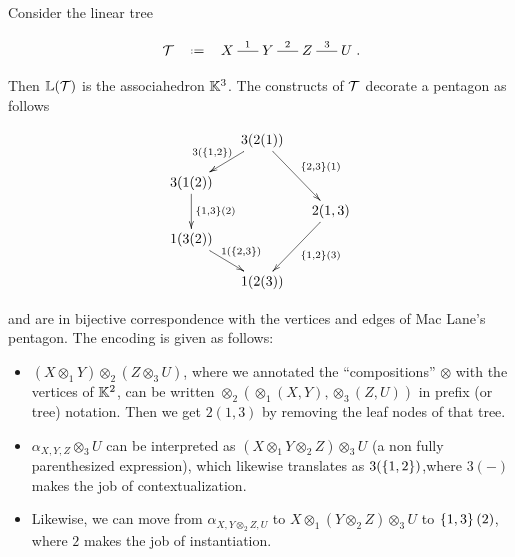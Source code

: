 \begin{example}
\begin{samepage}
Consider the linear tree
\vspace{-.7cm}
\begin{center}
$$\xymatrix @-1.65pc {{\cal T} & \eqdef  &X \ar @{-}[rr]^{1}&& Y \ar @{-}[rr]^{2}&& Z \ar @{-}[rr]^{3}&& U}.
  $$
\end{center}
\end{samepage}
Then ${\mathbb L}({\cal T})$ is the associahedron ${\mathbb K}^3$. 
The constructs of ${\cal T}$ decorate a pentagon as follows

\begin{center}
$$\xymatrix @-1.65pc {&& 3(2(1)) \ar @{->}[ddll]_{3(\set{1,2})} \ar @{->}[dddrr]^{\set{2,3}(1)}&& \\
 &&&&\\
3(1(2))   \ar @{->}[dd]^{\set{1,3}(2)}&&   && \\
 &&&&2(1,3) \ar @{->}[dddll]^{\set{1,2}(3)}\\
 1(3(2)) \ar @{->}[ddrr]^{1(\set{2,3})} &  &\\
 &&&&\\
 &&1(2(3))&&}$$
\end{center}
and are in bijective correspondence with the vertices and edges of Mac Lane's pentagon. 
The encoding is given as follows:
  \begin{itemize}
  \item $(X\otimes_1 Y)\otimes_2 (Z\otimes_3 U)$, where we annotated the ``compositions'' $\otimes$ with the vertices of ${\mathbb K}^2$, can be written $\otimes_2(\otimes_1(X,Y),\otimes_3(Z,U))$ in prefix (or tree) notation. Then we get 
 $2(1,3)$ by removing the leaf nodes of that tree.
 \item $\alpha_{X,Y,Z}\otimes_3 U$ can be interpreted as $(X\otimes_1 Y\otimes_2 Z)\otimes_3 U$ (a non fully parenthesized expression), which likewise 
 translates as $3(\left\{1,2\right\})$,where $3(-)$ makes the job of contextualization.
 \item Likewise, we can move from
$\alpha_{X,Y\otimes_2 Z,U}$ to $X\otimes_1(Y\otimes_2 Z)\otimes_3 U$ to $\left\{1,3\right\}(2)$, where $2$ makes the job of instantiation.
\end{itemize}
\end{example}

